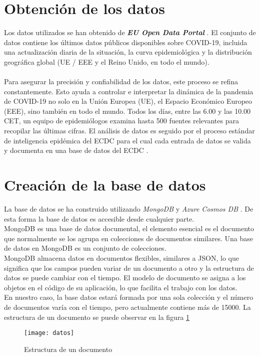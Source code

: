 \documentclass[11pt]{diazessay} %
\begin{document}
\newpage
\section*{Obtención de los datos}
Los datos utilizados se han obtenido de \textit{\textbf{EU Open Data Portal}} \cite{data}. El conjunto de datos contiene los últimos datos públicos disponibles sobre COVID-19, incluida una actualización diaria de la situación, la curva epidemiológica y la distribución geográfica global (UE / EEE y el Reino Unido, en todo el mundo).\\\\
Para asegurar la precisión y confiabilidad de los datos, este proceso se refina constantemente. Esto ayuda a controlar e interpretar la dinámica de la pandemia de COVID-19 no solo en la Unión Europea (UE), el Espacio Económico Europeo (EEE), sino también en todo el mundo. Todos los días, entre las 6.00 y las 10.00 CET, un equipo de epidemiólogos examina hasta 500 fuentes relevantes para recopilar las últimas cifras. El análisis de datos es seguido por el proceso estándar de inteligencia epidémica del ECDC para el cual cada entrada de datos se valida y documenta en una base de datos del ECDC \cite{ecdc}.

\clearpage

\section*{Creación de la base de datos}
La base de datos se ha construido utilizando \textit{MongoDB} \cite{mongodb} y \textit{Azure Cosmos DB} \cite{azure_cosmos}. De esta forma la base de datos es accesible desde cualquier parte. \\

MongoDB es una base de datos documental, el elemento esencial es el documento que normalmente se los agrupa en colecciones de documentos similares. Una base de datos en MongoDB es un conjunto de colecciones.\\

MongoDB almacena datos en documentos flexibles, similares a JSON, lo que significa que los campos pueden variar de un documento a otro y la estructura de datos se puede cambiar con el tiempo. El modelo de documento se asigna a los objetos en el código de su aplicación, lo que facilita el trabajo con los datos.\\

En nuestro caso, la base datos estará formada por una sola colección y el número de documentos varía con el tiempo, pero actualmente contiene más de 15000. La estructura de un documento se puede observar en la figura \ref{fig:estructura}
\begin{figure}[h!]
	\centering
	\texttt{[image: datos]}
	\caption{Estructura de un documento \cite{studio3t}}
	\label{fig:estructura}
\end{figure}
\end{document}
